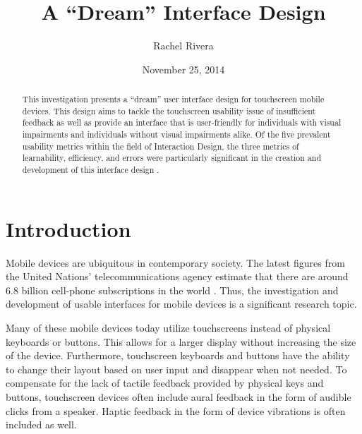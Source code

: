 \documentclass[11pt]{article}
\title{A ``Dream'' Interface Design}
\author{Rachel Rivera}
\date{November 25, 2014}
\begin{document}
\maketitle


\begin{abstract}
This investigation presents a ``dream'' user interface design for touchscreen mobile devices. This design aims to tackle the touchscreen usability issue of insufficient feedback as well as provide an interface that is user-friendly for individuals with visual impairments and individuals without visual impairments alike. Of the five prevalent usability metrics within the field of Interaction Design, the three metrics of learnability, efficiency, and errors were particularly significant in the creation and development of this interface design \cite{Nielsen:1993:UE:529793}.
\end{abstract}


\pagebreak
\tableofcontents



\pagebreak


\section{Introduction}
\label{Introduction}

Mobile devices are ubiquitous in contemporary society. The latest figures from the United Nations' telecommunications agency estimate that there are around 6.8 billion cell-phone subscriptions in the world \cite{UNTelecommunications	}. Thus, the investigation and development of usable interfaces for mobile devices is a significant research topic.

Many of these mobile devices today utilize touchscreens instead of physical keyboards or buttons. This allows for a larger display without increasing the size of the device. Furthermore, touchscreen keyboards and buttons have the ability to change their layout based on user input and disappear when not needed. To compensate for the lack of tactile feedback provided by physical keys and buttons, touchscreen devices often include aural feedback in the form of audible clicks from a speaker. Haptic feedback in the form of device vibrations is often included as well.
\end{document}
